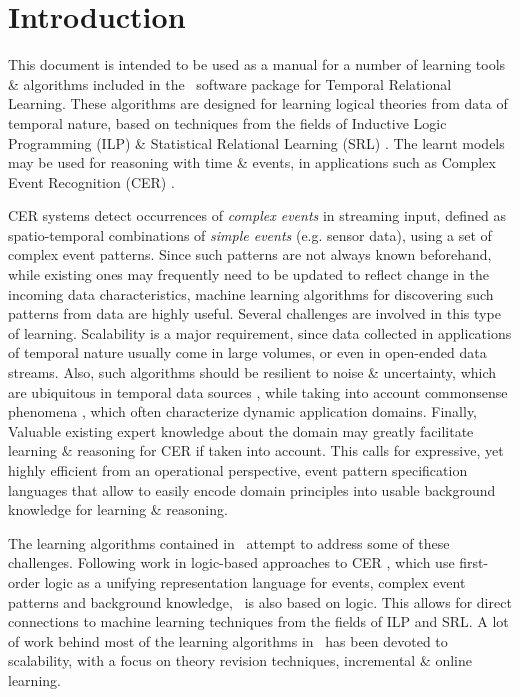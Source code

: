 \section{Introduction}
\label{sec:intro}

This document is intended to be used as a manual for a number of learning tools \& algorithms included in the \trail \ software package for Temporal Relational Learning. These algorithms are designed for learning logical theories from data of temporal nature, based on techniques from the fields of Inductive Logic Programming (ILP) \cite{de2008logical} \& Statistical Relational Learning (SRL) \cite{raedt2016statistical}. The learnt models may be used for reasoning with time \& events, in applications such as Complex Event Recognition (CER) \cite{cugola2012processing}. 

CER systems detect occurrences of \emph{complex events} in streaming input, defined as spatio-temporal combinations of \emph{simple events} (e.g. sensor data), using a set of complex event patterns. Since such patterns are not always known beforehand, while existing ones may frequently need to be updated to reflect change in the incoming data characteristics, machine learning algorithms for discovering such patterns from data are highly useful. Several challenges are involved in this type of learning. Scalability is a major requirement, since data collected in applications of temporal nature usually come in large volumes, or even in open-ended data streams. Also, such algorithms should be resilient to noise \& uncertainty, which are ubiquitous in temporal data sources \cite{DBLP:journals/corr/AlevizosSAP17}, while taking into account commonsense phenomena \cite{mueller2014commonsense}, which often characterize dynamic application domains. Finally, Valuable existing expert knowledge about the domain may greatly facilitate learning \& reasoning for CER if taken into account. This calls for expressive, yet highly efficient from an operational perspective, event pattern specification languages that allow to easily encode domain principles into usable background knowledge for learning \& reasoning. 

The learning algorithms contained in \trail \ attempt to address some of these challenges. Following work in logic-based approaches to CER \cite{artikis2012logic,artikis2015event}, which use first-order logic as a unifying representation language for events, complex event patterns and background knowledge, \trail \ is also based on logic. This allows for direct connections to machine learning techniques from the fields of ILP and SRL. A lot of work behind most of the learning algorithms in \trail \ has been devoted to scalability, with a focus on theory revision techniques, incremental \& online learning.\\

